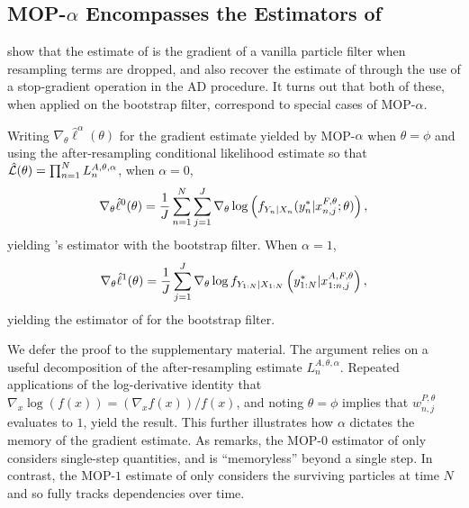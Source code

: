 \documentclass[9pt,twocolumn,pnasresearcharticle]{pnas-new}
\newcommand\arxiv[2]{#2} %
\begin{document}
\arxiv{}{\vspace*{-2mm}}
\subsection{MOP-$\alpha$ Encompasses the Estimators of \cite{poyiadjis11, scibior21, naesseth18}}

\cite{scibior21} show that the estimate of \cite{naesseth18} is the gradient of a vanilla particle filter when resampling terms are dropped, and also recover the estimate of \cite{poyiadjis11} through the use of a stop-gradient operation in the AD procedure. It turns out that both of these, when applied on the bootstrap filter, correspond to special cases of MOP-$\alpha$.


\begin{thm}
    \label{thm:mop-functional-forms}
    Writing $\nabla_\theta \hat\ell^\alpha(\theta)$ for the gradient estimate yielded by MOP-$\alpha$ when $\theta=\phi$ and using the after-resampling conditional likelihood estimate so that $\hat{\mathcal{L}}(\theta) = \prod_{n=1}^N L_n^{A, \theta, \alpha}$, when $\alpha=0$,
    \vspace*{-2.5mm}
    \begin{equation} \nonumber
        \nabla_\theta \hat\ell^0(\theta) 
        = \frac{1}{J} \sum_{n=1}^N \sum_{j=1}^J \nabla_\theta \log\left(f_{Y_n|X_{n}}(y_n^*|x_{n,j}^{F, \theta}; \theta)\right),
        \vspace*{-2.5mm}
    \end{equation}
    yielding \cite{naesseth18}'s estimator with the bootstrap filter. When $\alpha=1$,
    \vspace*{-2.5mm}
    \begin{equation} \nonumber
        \nabla_\theta \hat{\ell}^1(\theta) 
        = \frac{1}{J}\sum_{j=1}^J \nabla_\theta \log f_{Y_{1:N}|X_{1:N}}\left(y_{1:N}^* | x_{1:n,j}^{A, F,\theta}\right),
    \vspace*{-2.5mm}
    \end{equation}
    yielding the estimator of \cite{poyiadjis11, scibior21} for the bootstrap filter.
\end{thm}

We defer the proof to \arxiv{Appendix~\ref{appendix:functional}}{the supplementary material}. 
The argument relies on a useful decomposition of the after-resampling estimate $L_n^{A,\theta,\alpha}$. 
Repeated applications of the log-derivative identity that $\nabla_x \log(f(x)) = (\nabla_x f(x))/f(x)$, and noting $\theta=\phi$ implies that $w_{n,j}^{P,\theta}$ evaluates to $1$, yield the result. 
This further illustrates how $\alpha$ dictates the memory of the gradient estimate. 
As \cite{scibior21} remarks, the MOP-$0$ estimator of \cite{naesseth18} only considers single-step quantities, and is ``memoryless'' beyond a single step. 
In contrast, the MOP-$1$ estimate of \cite{poyiadjis11, scibior21} only considers the surviving particles at time $N$ and so fully tracks dependencies over time. 
\end{document}
